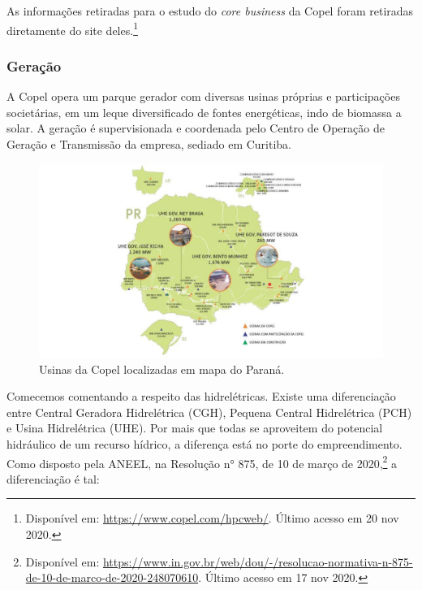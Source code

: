 \documentclass[aprovado,numbers]{coppe}
\begin{document}
  As informações retiradas para o estudo do \emph{core business} da Copel foram retiradas diretamente do site deles.\footnote{Disponível em: \url{https://www.copel.com/hpcweb/}. Último acesso em 20 nov 2020.}

  \hypertarget{gerauxe7uxe3o}{%
  \subsubsection{Geração}\label{gerauxe7uxe3o}}

  A Copel opera um parque gerador com diversas usinas próprias e participações societárias, em um leque diversificado de fontes energéticas, indo de biomassa a solar. A geração é supervisionada e coordenada pelo Centro de Operação de Geração e Transmissão da empresa, sediado em Curitiba.
  \begin{figure}[H]
  \includegraphics[width=1\linewidth]{img/usinas_copel} \caption{Usinas da Copel localizadas em mapa do Paraná.}\label{fig:unnamed-chunk-2}
  \end{figure}
  Comecemos comentando a respeito das hidrelétricas. Existe uma diferenciação entre Central Geradora Hidrelétrica (CGH), Pequena Central Hidrelétrica (PCH) e Usina Hidrelétrica (UHE). Por mais que todas se aproveitem do potencial hidráulico de um recurso hídrico, a diferença está no porte do empreendimento. Como disposto pela ANEEL, na Resolução n° 875, de 10 de março de 2020,\footnote{Disponível em: \url{https://www.in.gov.br/web/dou/-/resolucao-normativa-n-875-de-10-de-marco-de-2020-248070610}. Último acesso em 17 nov 2020.} a diferenciação é tal:
\end{document}
